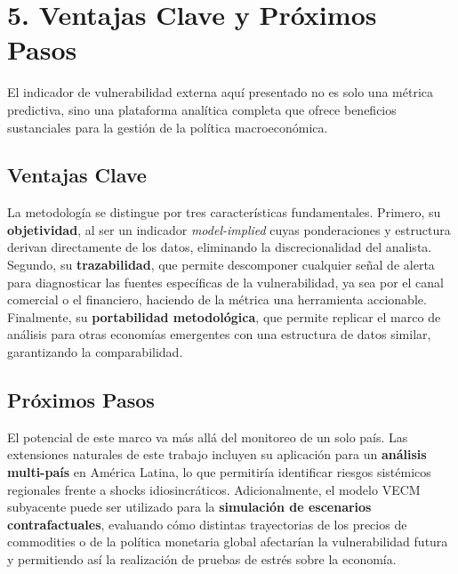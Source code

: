 \documentclass[11pt,a4paper]{article}
\begin{document}
\section*{5. Ventajas Clave y Próximos Pasos}

El indicador de vulnerabilidad externa aquí presentado no es solo una métrica predictiva, sino una plataforma analítica completa que ofrece beneficios sustanciales para la gestión de la política macroeconómica.

\subsection*{Ventajas Clave}
La metodología se distingue por tres características fundamentales. Primero, su \textbf{objetividad}, al ser un indicador \emph{model-implied} cuyas ponderaciones y estructura derivan directamente de los datos, eliminando la discrecionalidad del analista. Segundo, su \textbf{trazabilidad}, que permite descomponer cualquier señal de alerta para diagnosticar las fuentes específicas de la vulnerabilidad, ya sea por el canal comercial o el financiero, haciendo de la métrica una herramienta accionable. Finalmente, su \textbf{portabilidad metodológica}, que permite replicar el marco de análisis para otras economías emergentes con una estructura de datos similar, garantizando la comparabilidad.

\subsection*{Próximos Pasos}
El potencial de este marco va más allá del monitoreo de un solo país. Las extensiones naturales de este trabajo incluyen su aplicación para un \textbf{análisis multi-país} en América Latina, lo que permitiría identificar riesgos sistémicos regionales frente a shocks idiosincráticos. Adicionalmente, el modelo VECM subyacente puede ser utilizado para la \textbf{simulación de escenarios contrafactuales}, evaluando cómo distintas trayectorias de los precios de commodities o de la política monetaria global afectarían la vulnerabilidad futura y permitiendo así la realización de pruebas de estrés sobre la economía.

\printbibliography
\end{document}
